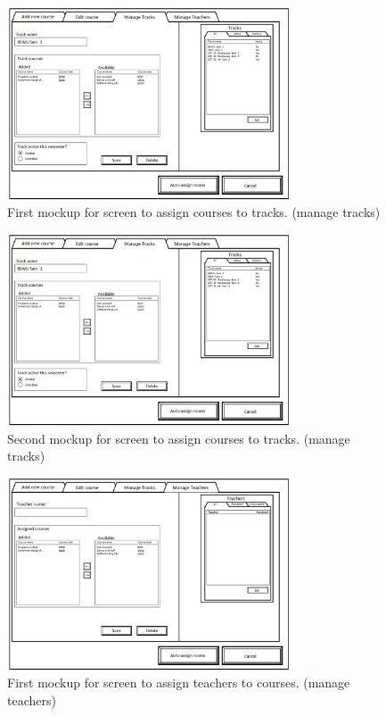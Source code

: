 \begin{figure}
\begin{center}
\leavevmode
\includegraphics[width=0.75\textwidth]{images/courseplan_managetracks}
\end{center}
\caption{First mockup for screen to assign courses to tracks. (manage tracks)}
\label{fig:app2_mock1_3}
\end{figure}

\begin{figure}
\begin{center}
\leavevmode
\includegraphics[width=0.75\textwidth]{images/courseplan2_managetracks}
\end{center}
\caption{Second mockup for screen to assign courses to tracks. (manage tracks)}
\label{fig:app2_mock2_3}
\end{figure}

\begin{figure}
\begin{center}
\leavevmode
\includegraphics[width=0.75\textwidth]{images/courseplan_manageteachers}
\end{center}
\caption{First mockup for screen to assign teachers to courses. (manage teachers)}
\label{fig:app2_mock1_4}
\end{figure}

